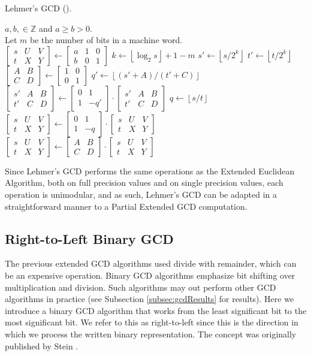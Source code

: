 \documentclass{ucalgthes1}
\theoremstyle{definition}
\newcommand{\ZZ}{\mathbb{Z}}
\newcommand{\matrixtt}[4]{\left[ \begin{array}{rr} #1 & #2 \\ #3 & #4 \end{array} \right]}
\newcommand{\matrixThreeTwo}[6]{\left[ \begin{array}{rrr} #1 & #2 & #3 \\ #4 & #5 & #6 \end{array} \right]}
\newcommand{\floor}[1]{\left\lfloor #1 \right\rfloor}
\begin{document}
\begin{algorithm}[h]
\caption{Lehmer's GCD (\cite{Lehmer1938}).}
\label{alg:lehmerGcd}
\begin{algorithmic}[1]
\REQUIRE $a,b, \in \ZZ$ and $a \ge b > 0$. \\
         Let $m$ be the number of bits in a machine word. \\
\STATE $\matrixThreeTwo{s}{U}{V}{t}{X}{Y} \gets \matrixThreeTwo{a}{1}{0}{b}{0}{1}$
	\STATE $k \gets \floor{\log_2 s} + 1 - m$
	\STATE $s' \gets \floor{s / 2^k}$ 
	\STATE $t' \gets \floor{t / 2^k}$
	\STATE $\matrixtt{A}{B}{C}{D} \gets \matrixtt{1}{0}{0}{1}$
	\WHILE{$t' \neq 0$ and $\floor{(s'+A)/(t'+C)} = \floor{(s'+B)/(t'+D)}$}
		\STATE $q' \gets \floor{(s'+A)/(t'+C)}$ 
		\STATE $\matrixThreeTwo{s'}{A}{B}{t'}{C}{D} \gets \matrixtt{0}{1}{1}{-q'}
			    \cdot \matrixThreeTwo{s'}{A}{B}{t'}{C}{D}$
	\ENDWHILE
		\STATE $q \gets \floor{s/t}$  
		\STATE $\matrixThreeTwo{s}{U}{V}{t}{X}{Y} \gets \matrixtt{0}{1}{1}{-q}
		        \cdot \matrixThreeTwo{s}{U}{V}{t}{X}{Y}$
	\ELSE
		\STATE $\matrixThreeTwo{s}{U}{V}{t}{X}{Y} \gets \matrixtt{A}{B}{C}{D}
		        \cdot \matrixThreeTwo{s}{U}{V}{t}{X}{Y}$ 
	\ENDIF
\ENDWHILE
\end{algorithmic}
\end{algorithm}

Since Lehmer's GCD performs the same operations as the Extended Euclidean Algorithm, both on full precision values and on single precision values, each operation is unimodular, and as such, Lehmer's GCD can be adapted in a straightforward manner to a Partial Extended GCD computation.

\subsection{Right-to-Left Binary GCD}
\label{subsec:r2lBinGcd}

The previous extended GCD algorithms used divide with remainder, which can be an expensive operation.  Binary GCD algorithms emphasize bit shifting over multiplication and division.  Such algorithms may out perform other GCD algorithms in practice (see Subsection \ref{subsec:gcdResults} for results).  Here we introduce a binary GCD algorithm that works from the least significant bit to the most significant bit.  We refer to this as right-to-left since this is the direction in which we process the written binary representation.  The concept was originally published by Stein \cite{Stein1967}.
\end{document}
